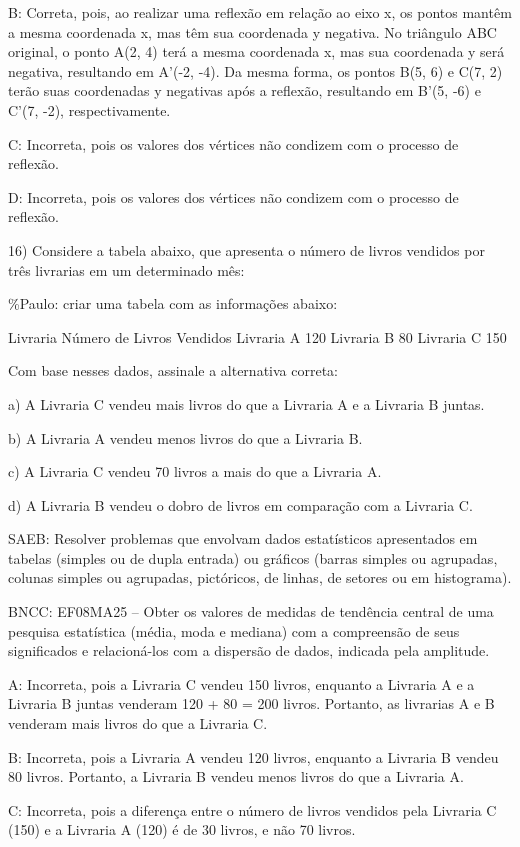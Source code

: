 B: Correta, pois, ao realizar uma reflexão em relação ao eixo x, os
pontos mantêm a mesma coordenada x, mas têm sua coordenada y negativa.
No triângulo ABC original, o ponto A(2, 4) terá a mesma coordenada x,
mas sua coordenada y será negativa, resultando em A'(-2, -4). Da mesma
forma, os pontos B(5, 6) e C(7, 2) terão suas coordenadas y negativas
após a reflexão, resultando em B'(5, -6) e C'(7, -2), respectivamente.

C: Incorreta, pois os valores dos vértices não condizem com o processo
de reflexão.

D: Incorreta, pois os valores dos vértices não condizem com o processo
de reflexão.

16) Considere a tabela abaixo, que apresenta o número de livros vendidos
por três livrarias em um determinado mês:

\%Paulo: criar uma tabela com as informações abaixo:

Livraria Número de Livros Vendidos Livraria A 120 Livraria B 80 Livraria
C 150

Com base nesses dados, assinale a alternativa correta:

a) A Livraria C vendeu mais livros do que a Livraria A e a Livraria B
juntas.

b) A Livraria A vendeu menos livros do que a Livraria B.

c) A Livraria C vendeu 70 livros a mais do que a Livraria A.

d) A Livraria B vendeu o dobro de livros em comparação com a Livraria C.

SAEB: Resolver problemas que envolvam dados estatísticos apresentados em
tabelas (simples ou de dupla entrada) ou gráficos (barras simples ou
agrupadas, colunas simples ou agrupadas, pictóricos, de linhas, de
setores ou em histograma).

BNCC: EF08MA25 -- Obter os valores de medidas de tendência central de
uma pesquisa estatística (média, moda e mediana) com a compreensão de
seus significados e relacioná-los com a dispersão de dados, indicada
pela amplitude.

A: Incorreta, pois a Livraria C vendeu 150 livros, enquanto a Livraria A
e a Livraria B juntas venderam 120 + 80 = 200 livros. Portanto, as
livrarias A e B venderam mais livros do que a Livraria C.

B: Incorreta, pois a Livraria A vendeu 120 livros, enquanto a Livraria B
vendeu 80 livros. Portanto, a Livraria B vendeu menos livros do que a
Livraria A.

C: Incorreta, pois a diferença entre o número de livros vendidos pela
Livraria C (150) e a Livraria A (120) é de 30 livros, e não 70 livros.

